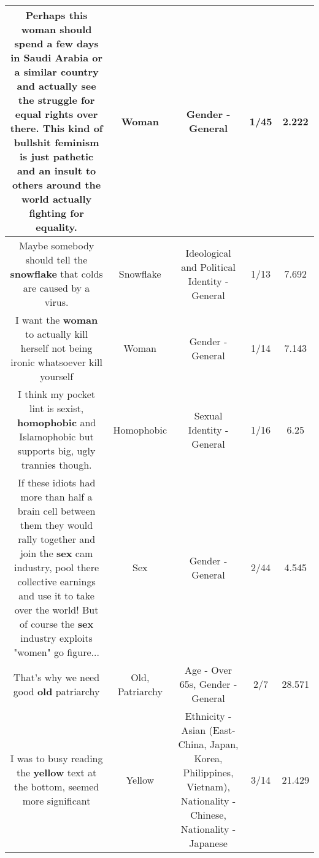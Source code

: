 \documentclass[11pt]{article}
\newlength\mylength
\begin{document}
\begin{center}
\begin{longtable}{|C{.65\mylength}|C{.30\mylength}|C{.12\mylength}|C{.12\mylength}|C{.12\mylength}|}
  \small Perhaps this \textbf{woman} should spend a few days in Saudi Arabia or a similar country and actually see the struggle for equal rights over there. This kind of bullshit feminism is just pathetic and an insult to others around the world actually fighting for equality.\normalsize   & Woman & Gender - General & 1/45 & 2.222 \\  \hline
  \small Maybe somebody should tell the \textbf{snowflake} that colds are caused by a virus.\normalsize   & Snowflake &  Ideological and Political Identity - General & 1/13 & 7.692 \\  \hline
  \small I want the \textbf{woman} to actually kill herself not being ironic whatsoever kill yourself\normalsize   & Woman & Gender - General & 1/14 & 7.143 \\  \hline
  \small I think my pocket lint is sexist, \textbf{homophobic} and Islamophobic but supports big, ugly trannies though.\normalsize   & Homophobic & Sexual Identity - General & 1/16 & 6.25 \\  \hline
  \small If these idiots had more than half a brain cell between them they would rally together and join the \textbf{sex} cam industry, pool there collective earnings and use it to take over the world! But of course the \textbf{sex} industry exploits "women" go figure...\normalsize   & Sex & Gender - General & 2/44 & 4.545 \\  \hline
  \small That's why we need good \textbf{old} patriarchy\normalsize   & Old, Patriarchy & Age - Over 65s, Gender - General & 2/7 & 28.571 \\  \hline
  \small I was to busy reading the \textbf{y\textbf{e\textbf{llow}}} text at the bottom, seemed more significant\normalsize   & Yellow & Ethnicity - Asian (East- China, Japan, Korea, Philippines, Vietnam), Nationality - Chinese, Nationality - Japanese & 3/14 & 21.429 \\  \hline

\end{longtable}
\end{center}
\end{document}
